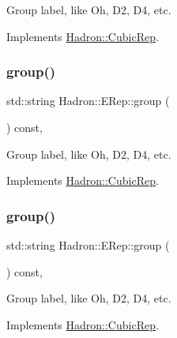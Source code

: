 Group label, like Oh, D2, D4, etc. 

Implements \mbox{\hyperlink{structHadron_1_1CubicRep_a0748f11ec87f387062c8e8981339a29c}{Hadron\+::\+Cubic\+Rep}}.

\mbox{\label{structHadron_1_1ERep_a832687372f6413d24ee1cf8c8b5c5f5f}} 
\subsubsection{\texorpdfstring{group()}{group()}\hspace{0.1cm}{\footnotesize\ttfamily [2/3]}}
{\footnotesize\ttfamily std\+::string Hadron\+::\+E\+Rep\+::group (\begin{DoxyParamCaption}{ }\end{DoxyParamCaption}) const\hspace{0.3cm}{\ttfamily [inline]}, {\ttfamily [virtual]}}

Group label, like Oh, D2, D4, etc. 

Implements \mbox{\hyperlink{structHadron_1_1CubicRep_a0748f11ec87f387062c8e8981339a29c}{Hadron\+::\+Cubic\+Rep}}.

\mbox{\label{structHadron_1_1ERep_a832687372f6413d24ee1cf8c8b5c5f5f}} 
\subsubsection{\texorpdfstring{group()}{group()}\hspace{0.1cm}{\footnotesize\ttfamily [3/3]}}
{\footnotesize\ttfamily std\+::string Hadron\+::\+E\+Rep\+::group (\begin{DoxyParamCaption}{ }\end{DoxyParamCaption}) const\hspace{0.3cm}{\ttfamily [inline]}, {\ttfamily [virtual]}}

Group label, like Oh, D2, D4, etc. 

Implements \mbox{\hyperlink{structHadron_1_1CubicRep_a0748f11ec87f387062c8e8981339a29c}{Hadron\+::\+Cubic\+Rep}}.

\mbox{\label{structHadron_1_1ERep_a388db41e3463a65498dca9ba2e1b7960}} 
